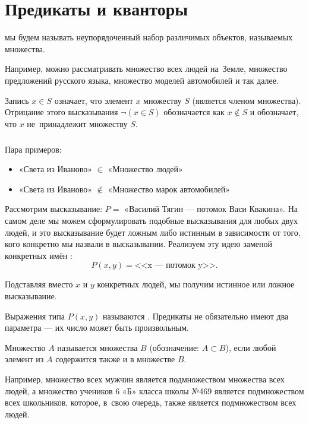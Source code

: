 \section{Предикаты и кванторы}

\begin{definition}
 мы будем называть неупорядоченный набор различимых объектов, называемых  множества.
\end{definition}

Например, можно рассматривать множество всех людей на~Земле, множество предложений русского языка, множество моделей автомобилей и так далее.

Запись $x \in S$ означает, что элемент $x$  множеству $S$ (является членом множества). Отрицание этого высказывания $\neg (x\in S)$ обозначается как $x\not \in S$ и обозначает, что $x$ не~принадлежит множеству $S$.

\subparagraph{} Пара примеров:

\begin{itemize}
\item «Света из Иваново» $\in$ «Множество людей»
\item «Света из Иваново» $\not\in$ «Множество марок автомобилей»
\end{itemize}

Рассмотрим высказывание: $P =$ «Василий Тягин — потомок Васи Квакина». На самом деле мы можем сформулировать подобные высказывания для любых двух людей, и это высказывание будет ложным либо истинным в зависимости от того, кого конкретно мы назвали в высказывании. Реализуем эту идею заменой конкретных имён : $$ P(x, y) = \mbox{<<x~--- потомок y>>}. $$

Подставляя вместо $x$ и $y$ конкретных людей, мы получим истинное или ложное высказывание.

Выражения типа $P(x, y)$ называются . Предикаты не обязательно имеют два параметра — их число может быть произвольным.

\begin{definition}
Множество $A$ называется  множества $B$ (обозначение: $A \subset B$), если любой элемент из $A$ содержится также и в множестве $B$.
\end{definition}

Например, множество всех мужчин является подмножеством множества всех людей, а множество учеников 6 «Б» класса школы №469 является подмножеством всех школьников, которое, в~свою очередь, также является подмножеством всех людей.

